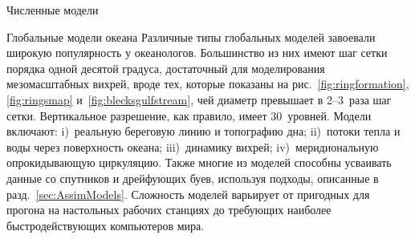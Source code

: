 \begin{chapter}{Численные модели}
\begin{section}{Глобальные модели океана}\label{sec:GlobalModels}
Различные типы глобальных моделей завоевали широкую популярность у океанологов.
Большинство из них имеют шаг сетки порядка одной десятой градуса, достаточный
для моделирования мезомасштабных вихрей, вроде
тех, которые показаны на рис.~\ref{fig:ringformation}, \ref{fig:ringsmap}
и~\ref{fig:blecksgulfstream}, чей диаметр превышает в 2--3~раза шаг сетки.
Вертикальное разрешение, как правило, имеет 30~уровней. Модели включают:
i)~реальную береговую линию и топографию дна; 
ii)~потоки тепла и воды через поверхность океана; 
iii)~динамику вихрей; 
iv)~меридиональную опрокидывающую 
циркуляцию.
Также многие из моделей способны усваивать данные со спутников и дрейфующих
буев, используя подходы, описанные в разд.~\ref{sec:AssimModels}. 
Сложность моделей варьирует от пригодных для прогона на настольных рабочих 
станциях до требующих наиболее быстродействующих компьютеров мира.
%



\end{section}
\end{chapter}
